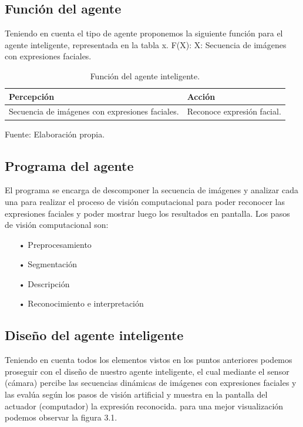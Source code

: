 \subsection{Función del agente}
Teniendo en cuenta el tipo de agente proponemos la siguiente función para el agente inteligente, representada en la tabla x.
\vskip 0.1cm
F(X): X: Secuencia de imágenes con expresiones faciales.

\begin{table}[ht!]
\centering
\caption{Función del agente inteligente.} \vskip 0.1cm
\begin{tabular}{|p{4cm} |p{3.5cm}|}  \hline 
\bf Percepción & \bf Acción \\ \hline 
Secuencia de imágenes con expresiones faciales. & Reconoce expresión facial. \\ \hline
\end{tabular} 
\begin{center}
{\small{Fuente: Elaboración propia.}}
\end{center}
\end{table}

\subsection{Programa del agente}
El programa se encarga de descomponer la secuencia de imágenes y analizar cada una para realizar el proceso de visión computacional para poder reconocer las expresiones faciales y poder mostrar luego los resultados en pantalla. Los pasos de visión computacional son:

\begin{itemize}
\item[•] Preprocesamiento
\item[•] Segmentación
\item[•] Descripción
\item[•] Reconocimiento e interpretación
\end{itemize}

\subsection{Diseño del agente inteligente}
Teniendo en cuenta todos los elementos vistos en los puntos anteriores podemos proseguir con el diseño de nuestro agente inteligente, el cual mediante el sensor (cámara) percibe las secuencias dinámicas de imágenes con expresiones faciales y las evalúa según los pasos de visión artificial y muestra en la pantalla del actuador (computador) la expresión reconocida. para una mejor visualización podemos observar la figura 3.1.

